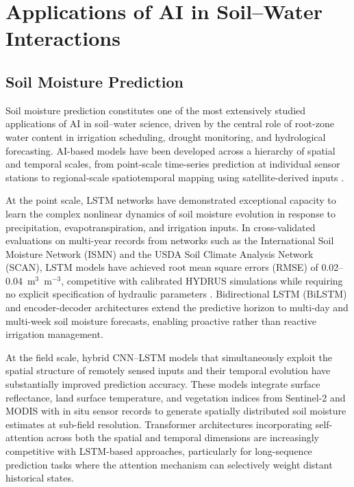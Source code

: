 \documentclass[land,article,submit,pdftex,moreauthors]{Definitions/mdpi}
\numberwithin{equation}{section}
\begin{document}
\section{Applications of AI in Soil--Water Interactions}

\subsection{Soil Moisture Prediction}

Soil moisture prediction constitutes one of the most extensively studied applications of AI in soil--water science, driven by the central role of root-zone water content in irrigation scheduling, drought monitoring, and hydrological forecasting. AI-based models have been developed across a hierarchy of spatial and temporal scales, from point-scale time-series prediction at individual sensor stations to regional-scale spatiotemporal mapping using satellite-derived inputs \citep{zhu2022lstm, fang2019deep}.

At the point scale, LSTM networks have demonstrated exceptional capacity to learn the complex nonlinear dynamics of soil moisture evolution in response to precipitation, evapotranspiration, and irrigation inputs. In cross-validated evaluations on multi-year records from networks such as the International Soil Moisture Network (ISMN) and the USDA Soil Climate Analysis Network (SCAN), LSTM models have achieved root mean square errors (RMSE) of 0.02--0.04~m$^3$~m$^{-3}$, competitive with calibrated HYDRUS simulations while requiring no explicit specification of hydraulic parameters \citep{kratzert2018rainfall}. Bidirectional LSTM (BiLSTM) and encoder-decoder architectures extend the predictive horizon to multi-day and multi-week soil moisture forecasts, enabling proactive rather than reactive irrigation management.

At the field scale, hybrid CNN--LSTM models that simultaneously exploit the spatial structure of remotely sensed inputs and their temporal evolution have substantially improved prediction accuracy. These models integrate surface reflectance, land surface temperature, and vegetation indices from Sentinel-2 and MODIS with in situ sensor records to generate spatially distributed soil moisture estimates at sub-field resolution. Transformer architectures incorporating self-attention across both the spatial and temporal dimensions are increasingly competitive with LSTM-based approaches, particularly for long-sequence prediction tasks where the attention mechanism can selectively weight distant historical states.
\end{document}
